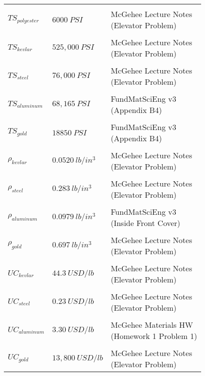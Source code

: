 \documentclass[paper=a4, fontsize=12pt]{scrartcl} %
\numberwithin{equation}{section} %
\numberwithin{figure}{section} %
\numberwithin{table}{section} %
\begin{document}
\begin{center}
\begin{tabularx}{350pt}{X X X}
\hline \\ [-1.5ex]
$TS_{polyester}$ & $6000\ PSI$ & \pbox{20cm}{McGehee Lecture Notes \\ (Elevator Problem)}\\[1.5ex]
\hline \\ [-1.5ex]
$TS_{kevlar}$ & $525,000\ PSI$ & \pbox{20cm}{McGehee Lecture Notes \\ (Elevator Problem)}\\[1.5ex]
\hline \\ [-1.5ex]
$TS_{steel}$ & $76,000\ PSI$& \pbox{20cm}{McGehee Lecture Notes \\ (Elevator Problem)}\\[1.5ex]
\hline \\ [-1.5ex]
$TS_{aluminum}$ & $68,165\ PSI$ & \pbox{15cm}{FundMatSciEng v3 \\ (Appendix B4)} \\[1.5ex]
\hline \\ [-1.5ex]
$TS_{gold}$ & $18850\ PSI$ & \pbox{15cm}{FundMatSciEng v3 \\ (Appendix B4)} \\[1.5ex]
\hline \\ [-1.5ex]
$\rho_{kevlar}$ & $0.0520\ lb/in^3$ & \pbox{20cm}{McGehee Lecture Notes \\ (Elevator Problem)}\\[1.5ex]
\hline \\ [-1.5ex]
$\rho_{steel}$ & $0.283\ lb/in^3$  & \pbox{20cm}{McGehee Lecture Notes \\ (Elevator Problem)}\\[1.5ex]
\hline \\ [-1.5ex]
$\rho_{aluminum}$ & $0.0979\ lb/in^3$ & \pbox{15cm}{FundMatSciEng v3 \\ (Inside Front Cover)} \\ [1.5ex]
\hline \\ [-1.5ex]
$\rho_{gold}$ & $0.697\ lb/in^3$ & \pbox{20cm}{McGehee Lecture Notes \\ (Elevator Problem)}\\[1.5ex]
\hline \\ [-1.5ex]
$UC_{kevlar}$ & $44.3\ USD/lb$ & \pbox{20cm}{McGehee Lecture Notes \\ (Elevator Problem)}\\[1.5ex]
\hline \\ [-1.5ex]
$UC_{steel}$ & $0.23\ USD/lb$ & \pbox{20cm}{McGehee Lecture Notes \\ (Elevator Problem)}\\[1.5ex]
\hline \\ [-1.5ex]
$UC_{aluminum}$ & $3.30\ USD/lb$ & \pbox{20cm}{McGehee Materials HW \\ (Homework 1 Problem 1)}\\[1.5ex]
\hline \\ [-1.5ex]
$UC_{gold}$ & $13,800\ USD/lb$ & \pbox{20cm}{McGehee Lecture Notes \\ (Elevator Problem)}\\[1.5ex]
\end{tabularx}
\end{center}
\end{document}
